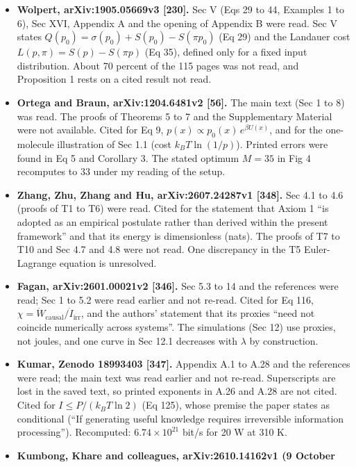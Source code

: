 \documentclass[
  10pt,
]{article}
\begin{document}
\begin{itemize}
\item
  \textbf{Wolpert, arXiv:1905.05669v3 {[}230{]}.} Sec V (Eqs 29 to 44,
  Examples 1 to 6), Sec XVI, Appendix A and the opening of Appendix B
  were read. Sec V states \(Q(p_0) = \sigma(p_0) + S(p_0) - S(\pi p_0)\)
  (Eq 29) and the Landauer cost \(L(p,\pi) = S(p) - S(\pi p)\) (Eq 35),
  defined only for a fixed input distribution. About 70 percent of the
  115 pages was not read, and Proposition 1 rests on a cited result not
  read.
\item
  \textbf{Ortega and Braun, arXiv:1204.6481v2 {[}56{]}.} The main text
  (Sec 1 to 8) was read. The proofs of Theorems 5 to 7 and the
  Supplementary Material were not available. Cited for Eq 9,
  \(p(x) \propto p_0(x)\, e^{\beta U(x)}\), and for the one-molecule
  illustration of Sec 1.1 (cost \(k_B T\ln(1/p)\)). Printed errors were
  found in Eq 5 and Corollary 3. The stated optimum \(M = 35\) in Fig 4
  recomputes to 33 under my reading of the setup.
\item
  \textbf{Zhang, Zhu, Zhang and Hu, arXiv:2607.24287v1 {[}348{]}.} Sec
  4.1 to 4.6 (proofs of T1 to T6) were read. Cited for the statement
  that Axiom 1 ``is adopted as an empirical postulate rather than
  derived within the present framework'' and that its energy is
  dimensionless (nats). The proofs of T7 to T10 and Sec 4.7 and 4.8 were
  not read. One discrepancy in the T5 Euler-Lagrange equation is
  unresolved.
\item
  \textbf{Fagan, arXiv:2601.00021v2 {[}346{]}.} Sec 5.3 to 14 and the
  references were read; Sec 1 to 5.2 were read earlier and not re-read.
  Cited for Eq 116,
  \(\chi = \dot W_{\mathrm{causal}} / \dot I_{\mathrm{irr}}\), and the
  authors' statement that its proxies ``need not coincide numerically
  across systems''. The simulations (Sec 12) use proxies, not joules,
  and one curve in Sec 12.1 decreases with \(\lambda\) by construction.
\item
  \textbf{Kumar, Zenodo 18993403 {[}347{]}.} Appendix A.1 to A.28 and
  the references were read; the main text was read earlier and not
  re-read. Superscripts are lost in the saved text, so printed exponents
  in A.26 and A.28 are not cited. Cited for \(I \le P/(k_B T\ln 2)\) (Eq
  125), whose premise the paper states as conditional (``If generating
  useful knowledge requires irreversible information processing'').
  Recomputed: \(6.74\times10^{21}\) bit/s for 20 W at 310 K.
\item
  \textbf{Kumbong, Khare and colleagues, arXiv:2610.14162v1 (9 October
}
\end{itemize}
\end{document}
